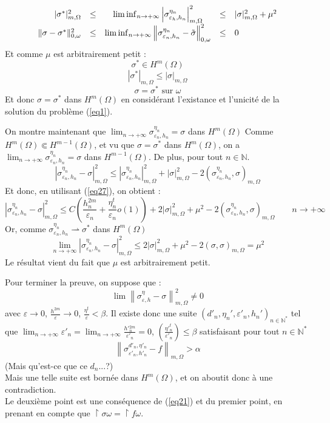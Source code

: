 \documentclass{article}
\begin{document}
\begin{dem}
\begin{equation}
\begin{array}{r c c c l}
|\sigma^*|^2_{m,\Omega}&\leq& \liminf_{n\to +\infty} \left|\sigma^{\eta_n}_{\varepsilon_h, h_n}\right|^2_{m,\Omega}&\leq& |\sigma|^2_{m,\Omega}+\mu^2\\
\|\sigma-\sigma^*\|^2_{0,\omega}&\leq& \liminf_{n\to +\infty} \left\|\sigma^{\eta_n}_{\varepsilon_n,h_n}-\tilde{\sigma}\right\|^2_{0,\omega}&\leq& 0
\end{array}
\end{equation}
Et comme $\mu$ est arbitrairement petit :
	\[\sigma^*\in H^m(\Omega)\]
	\[|\sigma^*|_{m,\Omega}\leq |\sigma|_{m,\Omega}\]
	\[\sigma=\sigma^* \text{ sur } \omega\]
Et donc $\sigma=\sigma^*$ dans $H^m(\Omega)$ en considérant l'existance et l'unicité de la solution du problème (\ref{eq1}).

\bigskip
On montre maintenant que $\lim_{n\to +\infty} \sigma^{\eta_n}_{\varepsilon_n, h_n}=\sigma$ dans $H^m(\Omega)$ Comme $H^m(\Omega)\Subset H^{m-1}(\Omega)$, et vu que $\sigma=\sigma^*$ dans $H^m(\Omega)$, on a $\lim_{n\to +\infty} \sigma^{\eta_n}_{\varepsilon_n, h_n}=\sigma$ dans $H^{m-1}(\Omega)$. De plus, pour tout $n\in\mathbb{N}$.
	\[\left| \sigma^{\eta_n}_{\varepsilon_n, h_n}-\sigma\right|^2_{m,\Omega}\leq \left| \sigma^{\eta_n}_{\varepsilon_n, h_n}\right|^2_{m,\Omega}+\left|\sigma\right|^2_{m,\Omega}-2\left( \sigma^{\eta_n}_{\varepsilon_n, h_n},\sigma\right)_{m,\Omega}\]
Et donc, en utilisant (\ref{eq27}), on obtient :
\[\left| \sigma^{\eta_n}_{\varepsilon_n, h_n}-\sigma\right|^2_{m,\Omega}\leq C\left(\frac{h_n^{2m}}{\varepsilon_n} + \frac{\eta_n^t}{\varepsilon_n} o(1) \right) + 2|\sigma|_{m,\Omega}^2+\mu^2-2\left( \sigma^{\eta_n}_{\varepsilon_n, h_n},\sigma\right)_{m,\Omega}\hspace{2em} n\to +\infty\]
Or, comme $\sigma^{\eta_n}_{\varepsilon_n, h_n}\rightharpoonup \sigma^*$ dans $H^m(\Omega)$ 
\[\lim_{n\to +\infty} \left| \sigma^{\eta_n}_{\varepsilon_n, h_n}-\sigma\right|^2_{m,\Omega}\leq 2|\sigma|_{m,\Omega}^2 +\mu^2-2(\sigma, \sigma)_{m,\Omega}=\mu^2\]
Le résultat vient du fait que $\mu$ est arbitrairement petit.

\bigskip
Pour terminer la preuve, on suppose que :
\[\lim \left\| \sigma^\eta_{\varepsilon, h}-\sigma\right\|^2_{m,\Omega}\neq 0\]
avec $\varepsilon\to 0$, $\frac{h^{2m}}{\varepsilon}\to 0$, $\frac{\eta^t}{\varepsilon}<\beta$. Il existe donc une suite $(d'_n, \eta_n', \varepsilon'_n, h_n')_{n\in\mathbb{N}^*}$ tel que $\lim_{n\to +\infty} \varepsilon'_n = \lim_{n\to +\infty} \frac{h'{}^{2m}_n}{\varepsilon'_n}=0$, $\left(\frac{\eta{}'^t_n}{\varepsilon'_n}\right)\leq \beta$ satisfaisant pour tout $n\in\mathbb{N}^*$
\[\left\| \sigma^{d'_n,\eta'_n}_{\varepsilon'_n, h'_n}-f\right\|_{m,\Omega}>\alpha\]
(Mais qu'est-ce que ce $d_n$...?)\\
Mais une telle suite est bornée dans $H^m(\Omega)$, et on aboutit donc à une contradiction.\\
Le deuxième point est une conséquence de (\ref{eq21}) et du premier point, en prenant en compte que $\restriction{\sigma}{\omega}=\restriction{f}{\omega}$.
\end{dem}



\end{document}
